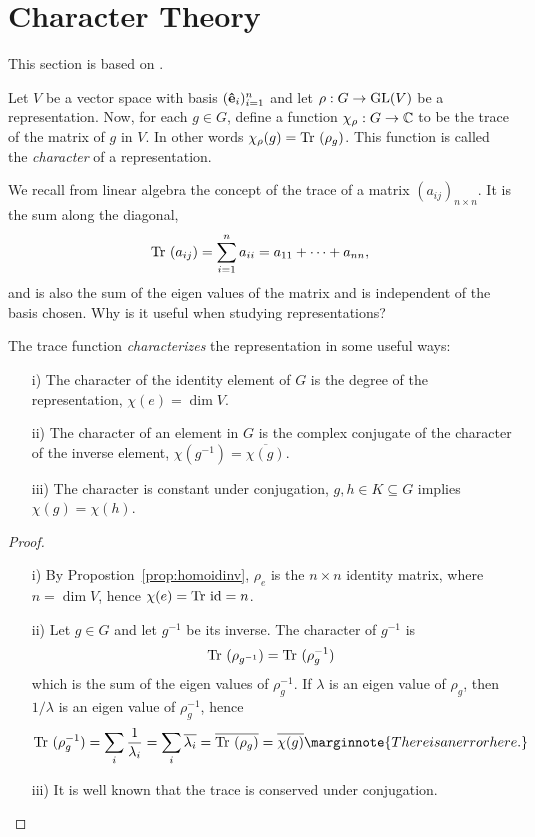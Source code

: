 \clearpage{\thispagestyle{empty}}
\section{Character Theory}

This section is based on \cite[Ch.2.]{Serre}.

Let $V$ be a vector space with basis $(\mathbf{\hat{e}}_i)_{i=1}^n$ and let $\rho: G \rightarrow \text{GL}(V)$ be a representation. Now, for each $g \in G$, define a function $\chi_{\rho}: G \rightarrow \mathbb{C}$ to be the trace of the matrix of $g$ in $V$. In other words $\chi_{\rho}(g) = \text{Tr }(\rho_g)$. This function is called the \emph{character} of a representation.

We recall from linear algebra the concept of the trace of a matrix $(a_{ij})_{n \times n}$. It is the sum along the diagonal,
\begin{align*}
	\text{Tr }(a_{ij})= \sum_{i=1}^{n} a_{ii} = a_{11} + \dots + a_{nn},
\end{align*}
and is also the sum of the eigen values of the matrix and is independent of the basis chosen. Why is it useful when studying representations?

\begin{proposition}\cite[Prop.2.1.]{Serre}
	The trace function \emph{characterizes} the representation in some useful ways:
	\begin{enumerate}
		\item[i)] The character of the identity element of $G$ is the degree of the representation, $\chi(e) = \dim V$.
		\item[ii)] The character of an element in $G$ is the complex conjugate of the character of the inverse element, $\chi(g^{-1}) = \overline{\chi(g)}$.
		\item[iii)] The character is constant under conjugation, $g,h \in K \subseteq G$ implies $\chi(g) = \chi(h)$.
	\end{enumerate}
\end{proposition}
\begin{proof}
	\begin{enumerate}
		\item[i)] By Propostion~\ref{prop:homoidinv}, $\rho_e$ is the $n \times n$ identity matrix, where $n = \dim V$, hence $\chi(e) = \text{Tr } \text{id} = n$.
		\item[ii)] Let $g \in G$ and let $g^{-1}$ be its inverse. The character of $g^{-1}$ is 
		\begin{align*}
			\text{Tr }(\rho_{g^{-1}}) = \text{Tr }(\rho_g^{-1})
		\end{align*}
		which is the sum of the eigen values of $\rho_g^{-1}$. If $\lambda$ is an eigen value of $\rho_g$, then $1/\lambda$ is an eigen value of $\rho_g^{-1}$, hence
		\begin{align*}
			\Tr(\rho_g^{-1}) = \sum_i \frac{1}{\lambda_i} = \sum_i \overline{\lambda_i} = \overline{\Tr(\rho_g)} = \overline{\chi(g)} \marginnote{There is an error here.}
		\end{align*} 
		\item[iii)] It is well known that the trace is conserved under conjugation. \qedhere
	\end{enumerate}
\end{proof}



